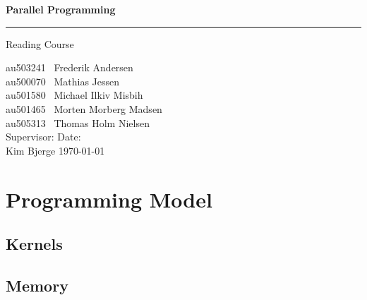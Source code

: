 \documentclass[12px,oz]{report}
\begin{document}
	
	\begin{titlepage}
		\centering
		\vspace*{3\baselineskip}
		{\Huge \bfseries Parallel Programming}
		\rule{\linewidth}{0.5mm}
		\LARGE
		Reading Course
		\\
		\null\vfill
		\begin{flushleft} \large
			au503241 \hspace*{2em} \  Frederik Andersen\\
			au500070 \hspace*{2em} \  Mathias Jessen\\
			au501580 \hspace*{2em} \  Michael Ilkiv Misbih\\
			au501465 \hspace*{2em} \  Morten Morberg Madsen\\
			au505313 \hspace*{2em} \  Thomas Holm Nielsen\\
			\vspace{100pt}
			Supervisor:\hspace{94pt}  Date: \\
			Kim Bjerge \hspace{90pt}  \today\\
		\end{flushleft}
		\vspace*{6\baselineskip}
	\end{titlepage}

\tableofcontents
\clearpage
{}
\cleardoublepage

\chapter{Programming Model}
\label{ch-programming-model}


	\section{Kernels}
	\label{sec-pm-kernels}
	
	
	\section{Memory}
	\label{sec-pm-memory}
	
	
\end{document}
